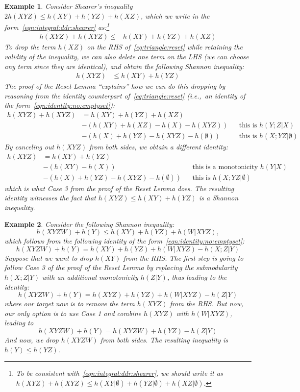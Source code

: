 \documentclass[10pt,a4paper]{article}
\newtheorem{example}{Example}[section]
\begin{document}
\begin{example}
  Consider Shearer's inequality $2h(XYZ) \leq h(XY)+h(YZ)+h(XZ)$, which we write in the
  form~\eqref{eqn:integral:ddr:shearer} as:\footnote{To be consistent
  with~\eqref{eqn:integral:ddr:shearer}, we should write it as $h(XYZ)+h(XYZ)\leq
  h(XY|\emptyset)+h(YZ|\emptyset)+h(XZ|\emptyset)$.}
%
  \begin{align}
    h(XYZ)+h(XYZ) \leq & h(XY)+h(YZ)+h(XZ) \label{eq:triangle:reset}
  \end{align}
%
  To drop the term $h(XZ)$ on the RHS of~\eqref{eq:triangle:reset} while retaining the
  validity of the inequality, we can also delete one term on the LHS (we can choose any term since they are
  identical), and obtain the following Shannon inequality:
%
  \begin{align*}
    h(XYZ) & \leq h(XY)+h(YZ)
  \end{align*}
  The proof of the Reset Lemma ``explains'' how we can do this dropping by reasoning
  from the identity counterpart of~\eqref{eq:triangle:reset} (i.e.,~an identity of
the form~\eqref{eqn:identity:no:emptyset}):
  \begin{align}
    h(XYZ)+h(XYZ)
      &= h(XY)+h(YZ)+h(XZ)\nonumber\\
    &- (h(XY)+h(XZ)-h(X)-h(XYZ)) && \text{this is } h(Y;Z | X)\nonumber\\
    &-  (h(X)+h(YZ)-h(XYZ)-h(\emptyset)) && \text{this is } h(X; YZ | \emptyset)
  \label{eq:triangle:reset:identity}
  \end{align}
  By canceling out $h(XYZ)$ from both sides, we obtain a different identity:
  \begin{align}
    h(XYZ)&= h(XY)+h(YZ)\nonumber\\
&-(h(XY) - h(X)) && \text{this is a monotonicity } h(Y|X)\nonumber\\
&-(h(X)+h(YZ)-h(XYZ)-h(\emptyset))  && \text{this is } h(X; YZ | \emptyset)\label{eq:triangle:reset:identity2}
  \end{align}
which is what Case 3 from the proof of the Reset Lemma does.
The resulting identity witnesses the fact that $h(XYZ) \leq h(XY)+h(YZ)$ is a Shannon inequality.
\end{example}

\begin{example}
  Consider the following Shannon inequality:
  \[h(XYZW) + h(Y) \leq h(XY) + h(YZ) + h(W|XYZ),\]
  which follows from the following identity of the form~\eqref{eqn:identity:no:emptyset}:
  \[h(XYZW) + h(Y) = h(XY) + h(YZ) + h(W|XYZ) - h(X;Z|Y)\]
  Suppose that we
  want to drop $h(XY)$ from the RHS. The first step is going to
  follow Case 3 of the proof of the Reset Lemma by
  replacing the submodularity $h(X;Z|Y)$ with an additional monotonicity $h(Z|Y)$, thus leading to the identity:
  \[h(XYZW) + h(Y) = h(XYZ) + h(YZ) + h(W|XYZ) - h(Z|Y)\] where our target
  now is to remove the term $h(XYZ)$ from the RHS.  But now, our
  only option is to use Case 1 and combine $h(XYZ)$ with $h(W|XYZ)$, leading to
  \[h(XYZW) + h(Y) = h(XYZW) + h(YZ) - h(Z|Y)\] And now, we drop $h(XYZW)$
  from both sides. The resulting inequality is $h(Y) \leq h(YZ)$.
\end{example}
\end{document}

